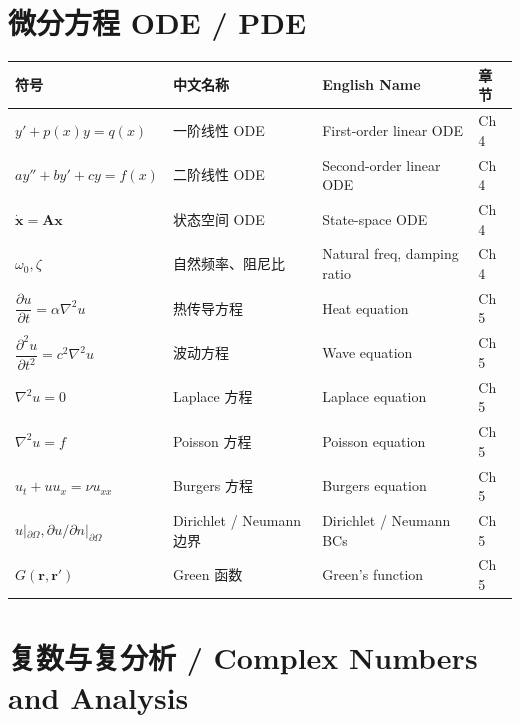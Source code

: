 \section{微分方程 ODE / PDE}

\begin{center}
\renewcommand{\arraystretch}{1.25}
\begin{tabular}{@{}llll@{}}
\toprule
\textbf{符号} & \textbf{中文名称} & \textbf{English Name} & \textbf{章节} \\
\midrule
$y' + p(x)y = q(x)$ & 一阶线性 ODE & First-order linear ODE & Ch 4 \\
$ay'' + by' + cy = f(x)$ & 二阶线性 ODE & Second-order linear ODE & Ch 4 \\
$\dot{\mathbf{x}} = \mathbf{A}\mathbf{x}$ & 状态空间 ODE & State-space ODE & Ch 4 \\
$\omega_0, \zeta$ & 自然频率、阻尼比 & Natural freq, damping ratio & Ch 4 \\
$\dfrac{\partial u}{\partial t} = \alpha \nabla^2 u$ & 热传导方程 & Heat equation & Ch 5 \\
$\dfrac{\partial^2 u}{\partial t^2} = c^2 \nabla^2 u$ & 波动方程 & Wave equation & Ch 5 \\
$\nabla^2 u = 0$ & Laplace 方程 & Laplace equation & Ch 5 \\
$\nabla^2 u = f$ & Poisson 方程 & Poisson equation & Ch 5 \\
$u_t + u u_x = \nu u_{xx}$ & Burgers 方程 & Burgers equation & Ch 5 \\
$u|_{\partial \Omega}, \partial u / \partial n|_{\partial \Omega}$ & Dirichlet / Neumann 边界 & Dirichlet / Neumann BCs & Ch 5 \\
$G(\mathbf{r}, \mathbf{r}')$ & Green 函数 & Green's function & Ch 5 \\
\bottomrule
\end{tabular}
\end{center}

\section{复数与复分析 / Complex Numbers and Analysis}

